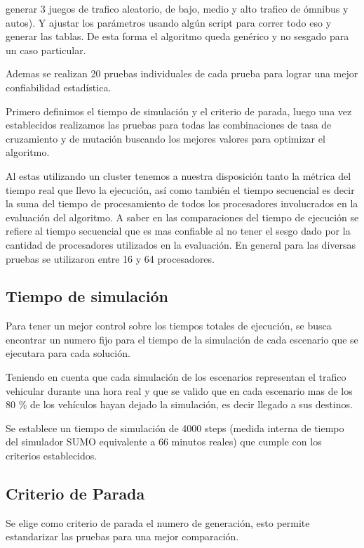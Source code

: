 generar 3 juegos de trafico aleatorio, de bajo, medio y alto trafico de ómnibus y autos). Y ajustar los parámetros usando algún script para correr todo eso y generar las tablas. De esta forma el algoritmo queda genérico y no sesgado para un caso particular.

Ademas se realizan 20 pruebas individuales de cada prueba para lograr una mejor confiabilidad estadística.

Primero definimos el tiempo de simulación y el criterio de parada, luego una vez establecidos realizamos las pruebas para todas las combinaciones de tasa de cruzamiento y de mutación buscando los mejores valores para optimizar el algoritmo.


Al estas utilizando un cluster tenemos a nuestra disposición tanto la métrica del tiempo real que llevo la ejecución, así como también el tiempo secuencial es decir la suma del tiempo de procesamiento de todos los procesadores involucrados en la evaluación del algoritmo. 
A saber en las comparaciones del tiempo de ejecución se refiere al tiempo secuencial que es mas confiable al no tener el sesgo dado por la cantidad de procesadores utilizados en la evaluación.
En general para las diversas pruebas se utilizaron entre 16 y 64 procesadores.




\subsection{Tiempo de simulación}

Para tener un mejor control sobre los tiempos totales de ejecución, se busca encontrar un numero fijo para el tiempo de la simulación de cada escenario que se ejecutara para cada solución.

Teniendo en cuenta que cada simulación de los escenarios representan el trafico vehicular durante una hora real y que se valido que en cada escenario mas de los 80 \% de los vehículos hayan dejado la simulación, es decir llegado a sus destinos.

Se establece un tiempo de simulación de 4000 steps (medida interna de tiempo del simulador SUMO equivalente a 66 minutos reales) que cumple con los criterios establecidos. 

\subsection{Criterio de Parada}
Se elige como criterio de parada el numero de generación, esto permite estandarizar las pruebas para una mejor comparación.

